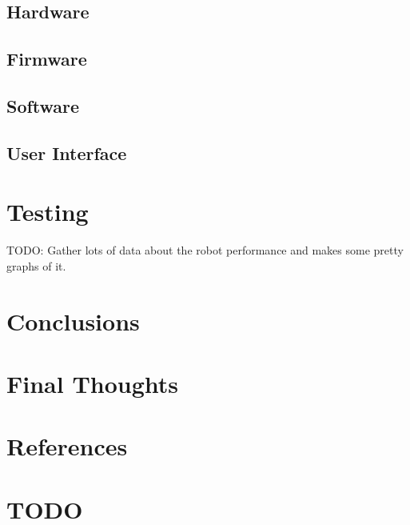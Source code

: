 \documentclass[a4paper,12pt]{article}
\begin{document}
\subsection{Hardware}


\subsection{Firmware}


\subsection{Software}


\subsection{User Interface}


\section{Testing}


TODO: Gather lots of data about the robot performance and makes some pretty graphs of it.

\section{Conclusions}

\section{Final Thoughts}


\section{References}


\section{TODO}

\end{document}
